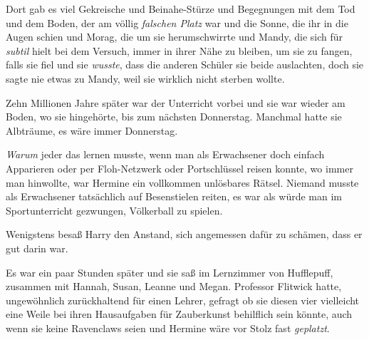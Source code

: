 Dort gab es viel Gekreische und Beinahe-Stürze und Begegnungen mit dem Tod und dem Boden, der am völlig \emph{falschen Platz} war und die Sonne, die ihr in die Augen schien und Morag, die um sie herumschwirrte und Mandy, die sich für \emph{subtil} hielt bei dem Versuch, immer in ihrer Nähe zu bleiben, um sie zu fangen, falls sie fiel und sie \emph{wusste}, dass die anderen Schüler sie beide auslachten, doch sie sagte nie etwas zu Mandy, weil sie wirklich nicht sterben wollte.

Zehn Millionen Jahre später war der Unterricht vorbei und sie war wieder am Boden, wo sie hingehörte, bis zum nächsten Donnerstag. Manchmal hatte sie Albträume, es wäre immer Donnerstag.

\emph{Warum} jeder das lernen musste, wenn man als Erwachsener doch einfach Apparieren oder per Floh-Netzwerk oder Portschlüssel reisen konnte, wo immer man hinwollte, war Hermine ein vollkommen unlösbares Rätsel. Niemand musste als Erwachsener tatsächlich auf Besenstielen reiten, es war als würde man im Sportunterricht gezwungen, Völkerball zu spielen.

Wenigstens besaß Harry den Anstand, sich angemessen dafür zu schämen, dass er gut darin war.

\later

Es war ein paar Stunden später und sie saß im Lernzimmer von Hufflepuff, zusammen mit Hannah, Susan, Leanne und Megan. Professor Flitwick hatte, ungewöhnlich zurückhaltend für einen Lehrer, gefragt ob sie diesen vier vielleicht eine Weile bei ihren Hausaufgaben für Zauberkunst behilflich sein könnte, auch wenn sie keine Ravenclaws seien und Hermine wäre vor Stolz fast \emph{geplatzt}.

